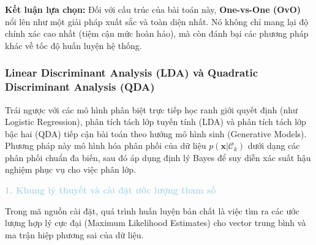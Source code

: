 \textbf{Kết luận lựa chọn:} Đối với cấu trúc của bài toán này, \textbf{One-vs-One (OvO)} nổi lên như một giải pháp xuất sắc và toàn diện nhất. Nó không chỉ mang lại độ chính xác cao nhất (tiệm cận mức hoàn hảo), mà còn đánh bại các phương pháp khác về tốc độ huấn luyện hệ thống.

\subsubsection{Linear Discriminant Analysis (LDA) và Quadratic Discriminant Analysis (QDA)}

Trái ngược với các mô hình phân biệt trực tiếp học ranh giới quyết định (như Logistic Regression), phân tích tách lớp tuyến tính (LDA) và phân tích tách lớp bậc hai (QDA) tiếp cận bài toán theo hướng mô hình sinh (Generative Models). Phương pháp này mô hình hóa phân phối của dữ liệu $p(\mathbf{x}|\mathcal{C}_k)$ dưới dạng các phân phối chuẩn đa biến, sau đó áp dụng định lý Bayes để suy diễn xác suất hậu nghiệm phục vụ cho việc phân lớp.

\vspace{0.5em}
\noindent\textcolor{lightblue}{\textbf{1. Khung lý thuyết và cài đặt ước lượng tham số}}
\vspace{0.5em}

Trong mã nguồn cài đặt, quá trình huấn luyện bản chất là việc tìm ra các ước lượng hợp lý cực đại (Maximum Likelihood Estimates) cho vector trung bình và ma trận hiệp phương sai của dữ liệu.

